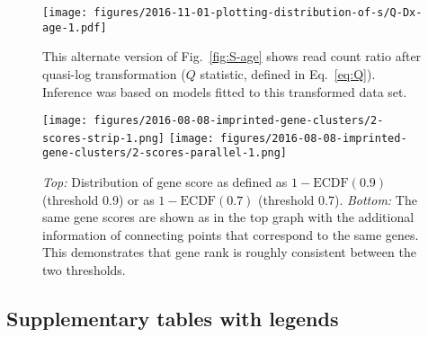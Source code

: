\documentclass[letterpaper]{article}
\begin{document}
\begin{figure}[H]
\begin{center}
\texttt{[image: figures/2016-11-01-plotting-distribution-of-s/Q-Dx-age-1.pdf]}
\end{center}
\caption{
This alternate version of Fig.~\ref{fig:S-age} shows read count ratio after
quasi-log transformation (\(Q\) statistic, defined in Eq.~\ref{eq:Q}).
Inference was based on models fitted to this transformed data set.
}
\label{fig:Q-age}
\end{figure}

\begin{figure}[H]
\begin{center}
\texttt{[image: figures/2016-08-08-imprinted-gene-clusters/2-scores-strip-1.png]}
\texttt{[image: figures/2016-08-08-imprinted-gene-clusters/2-scores-parallel-1.png]}
\end{center}
\caption{
\emph{Top:} Distribution of gene score as defined as \(1 - \mathrm{ECDF}(0.9)\) (threshold
0.9) or as \(1 - \mathrm{ECDF}(0.7)\) (threshold 0.7).
\emph{Bottom:} The same gene scores are shown as in the top graph with the
additional information of connecting points that correspond to the same genes.
This demonstrates that gene rank is roughly consistent between the two
thresholds.
}
\label{fig:2-scores}
\end{figure}

\clearpage

\subsection{Supplementary tables with legends}

\setcounter{table}{0}
\makeatletter 
\renewcommand{\thetable}{S\@arabic\c@table}
\makeatother
\end{document}

